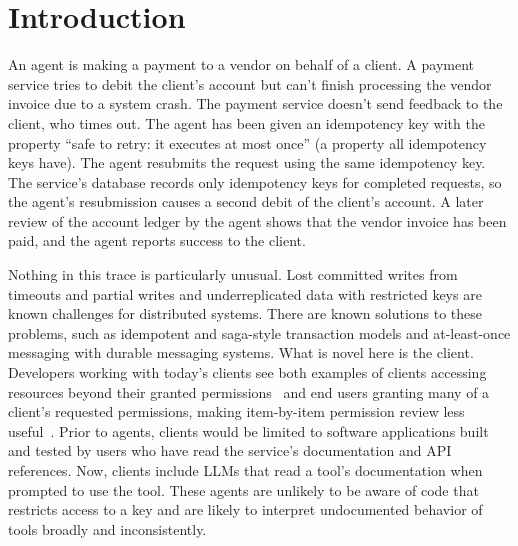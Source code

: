 \documentclass[letterpaper,twocolumn,10pt]{article}
\begin{document}
\begin{abstract}
Eleven preregistered experiments with LLMs found that the tool control system prevented unseen error-related harms for all tested models after the tool control system was implemented. This result held when run on a systems using a Postgres cluster and standard HTTP servers.

The implementation of the contract further reduced the risk of improper key use from 18\% to 5\%, but other model-specific results suggest that risk from improper key use may increase for some key use cases until the tool use contract is updated to include methods for completing incomplete transactions, which reduced risk to 1\%. The tool control system adds one additional round trip per write transaction in the absence of errors, but a fast path for completing hidden incomplete transactions using the tool use contract reduced processing time from 10 seconds of polling to 0.2 seconds (after the 3 second client timeout). This improvement is visible in Table~\ref{tab:o2} with a 3.2 second call to the payment endpoint using the fast path logic compared to 13.3 seconds without it.
\end{abstract}

\section{Introduction}\label{sec:1}

An agent is making a payment to a vendor on behalf of a client. A payment service tries to debit the client's account but can't finish processing the vendor invoice due to a system crash. The payment service doesn't send feedback to the client, who times out. The agent has been given an idempotency key with the property ``safe to retry: it executes at most once'' (a property all idempotency keys have). The agent resubmits the request using the same idempotency key. The service's database records only idempotency keys for completed requests, so the agent's resubmission causes a second debit of the client's account. A later review of the account ledger by the agent shows that the vendor invoice has been paid, and the agent reports success to the client.

Nothing in this trace is particularly unusual. Lost committed writes from timeouts and partial writes and underreplicated data with restricted keys are known challenges for distributed systems. There are known solutions to these problems, such as idempotent and saga-style transaction models and at-least-once messaging with durable messaging systems. What is novel here is the client. Developers working with today's clients see both examples of clients accessing resources beyond their granted permissions~\cite{anthropic2026unintended} and end users granting many of a client's requested permissions, making item-by-item permission review less useful~\cite{anthropic2026automode}. Prior to agents, clients would be limited to software applications built and tested by users who have read the service's documentation and API references. Now, clients include LLMs that read a tool's documentation when prompted to use the tool. These agents are unlikely to be aware of code that restricts access to a key and are likely to interpret undocumented behavior of tools broadly and inconsistently.
\end{document}
